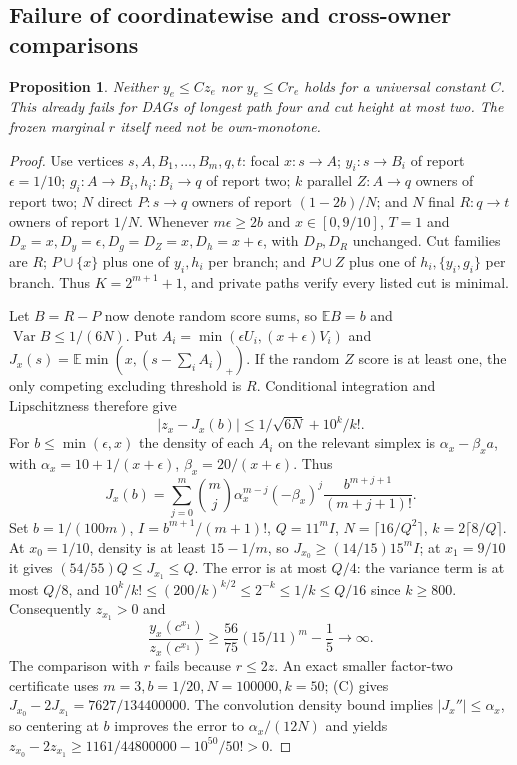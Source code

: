 \documentclass[11pt]{article}
\newtheorem{proposition}[theorem]{Proposition}
\theoremstyle{definition}\newtheorem{definition}[theorem]{Definition}
\theoremstyle{remark}\newtheorem{remark}[theorem]{Remark}
\newcommand{\E}{\mathbb E}
\begin{document}
\subsection{Failure of coordinatewise and cross-owner comparisons}
\begin{proposition}\label{noise:pointwise}
Neither $y_e\le Cz_e$ nor $y_e\le Cr_e$ holds for a universal constant
$C$. This already fails for DAGs of longest path four and cut height at
most two. The frozen marginal $r$ itself need not be own-monotone.
\end{proposition}
\begin{proof}
Use vertices $s,A,B_1,\ldots,B_m,q,t$: focal $x:s\to A$;
$y_i:s\to B_i$ of report $\epsilon=1/10$;
$g_i:A\to B_i,h_i:B_i\to q$ of report two;
$k$ parallel $Z:A\to q$ owners of report two;
$N$ direct $P:s\to q$ owners of report $(1-2b)/N$;
and $N$ final $R:q\to t$ owners of report $1/N$.
Whenever $m\epsilon\ge2b$ and $x\in[0,9/10]$, $T=1$ and
$D_x=x,D_y=\epsilon,D_g=D_Z=x,D_h=x+\epsilon$, with $D_P,D_R$ unchanged.
Cut families are $R$; $P\cup\{x\}$ plus one of $y_i,h_i$ per branch;
and $P\cup Z$ plus one of $h_i,\{y_i,g_i\}$ per branch.
Thus $K=2^{m+1}+1$, and private paths verify every listed cut is minimal.

Let $B=R-P$ now denote random score sums, so $\E B=b$ and
$\operatorname{Var}B\le1/(6N)$. Put
$A_i=\min(\epsilon U_i,(x+\epsilon)V_i)$ and
$J_x(s)=\E\min(x,(s-\sum_iA_i)_+)$.
If the random $Z$ score is at least one, the only competing excluding
threshold is $R$. Conditional integration and Lipschitzness therefore give
\[
 |z_x-J_x(b)|\le1/\sqrt{6N}+10^k/k!.
\]
For $b\le\min(\epsilon,x)$ the density of each $A_i$ on the relevant
simplex is $\alpha_x-\beta_xa$, with
$\alpha_x=10+1/(x+\epsilon)$, $\beta_x=20/(x+\epsilon)$. Thus
\[
 J_x(b)=\sum_{j=0}^m\binom mj\alpha_x^{m-j}(-\beta_x)^j
                      \frac{b^{m+j+1}}{(m+j+1)!}.       \tag{C}
\]
Set $b=1/(100m)$, $I=b^{m+1}/(m+1)!$, $Q=11^mI$,
$N=\lceil16/Q^2\rceil$, $k=2\lceil8/Q\rceil$.
At $x_0=1/10$, density is at least $15-1/m$, so
$J_{x_0}\ge(14/15)15^mI$; at $x_1=9/10$ it gives
$(54/55)Q\le J_{x_1}\le Q$.
The error is at most $Q/4$: the variance term is at most $Q/8$, and
$10^k/k!\le(200/k)^{k/2}\le2^{-k}\le1/k\le Q/16$ since $k\ge800$.
Consequently $z_{x_1}>0$ and
\[
 \frac{y_x(c^{x_1})}{z_x(c^{x_1})}
 \ge\frac{56}{75}(15/11)^m-\frac15\longrightarrow\infty.
\]
The comparison with $r$ fails because $r\le2z$.
An exact smaller factor-two certificate uses $m=3,b=1/20,N=100000,k=50$;
(C) gives $J_{x_0}-2J_{x_1}=7627/134400000$.
The convolution density bound implies $|J_x''|\le\alpha_x$, so centering
at $b$ improves the error to $\alpha_x/(12N)$ and yields
$z_{x_0}-2z_{x_1}\ge1161/44800000-10^{50}/50!>0$.


\end{proof}
\end{document}
